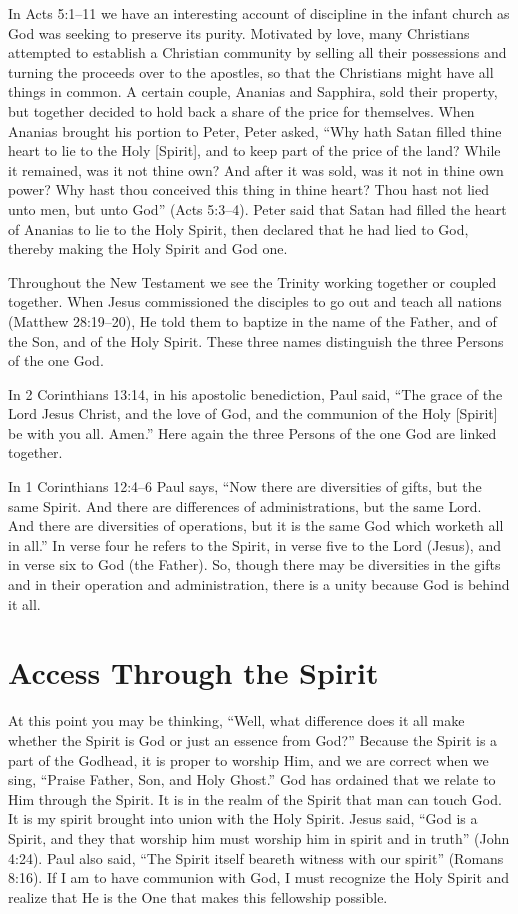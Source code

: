 In Acts 5:1–11 we have an interesting account of discipline
in the infant church as God was seeking to preserve
its purity. Motivated by love, many Christians attempted
to establish a Christian community by selling all their possessions
and turning the proceeds over to the apostles, so
that the Christians might have all things in common. A certain
couple, Ananias and Sapphira, sold their property, but
together decided to hold back a share of the price for themselves.
When Ananias brought his portion to Peter, Peter
asked, “Why hath Satan filled thine heart to lie to the Holy
[Spirit], and to keep part of the price of the land? While it
remained, was it not thine own? And after it was sold, was
it not in thine own power? Why hast thou conceived this
thing in thine heart? Thou hast not lied unto men, but unto
God” (Acts 5:3–4). Peter said that Satan had filled the heart
of Ananias to lie to the Holy Spirit, then declared that he
had lied to God, thereby making the Holy Spirit and God
one.

Throughout the New Testament we see the Trinity working
together or coupled together. When Jesus commissioned
the disciples to go out and teach all nations (Matthew
28:19–20), He told them to baptize in the name of the Father,
and of the Son, and of the Holy Spirit. These three names
distinguish the three Persons of the one God.

In 2 Corinthians 13:14, in his apostolic benediction, Paul
said, “The grace of the Lord Jesus Christ, and the love of
God, and the communion of the Holy [Spirit] be with you
all. Amen.” Here again the three Persons of the one God are
linked together.

In 1 Corinthians 12:4–6 Paul says, “Now there are diversities
of gifts, but the same Spirit. And there are differences
of administrations, but the same Lord. And there are diversities
of operations, but it is the same God which worketh
all in all.” In verse four he refers to the Spirit, in verse five
to the Lord (Jesus), and in verse six to God (the Father).
So, though there may be diversities in the gifts and in their
operation and administration, there is a unity because God
is behind it all.


\section*{Access Through the Spirit}

At this point you may be thinking, “Well, what difference
does it all make whether the Spirit is God or just an
essence from God?” Because the Spirit is a part of the Godhead,
it is proper to worship Him, and we are correct when
we sing, “Praise Father, Son, and Holy Ghost.” God has
ordained that we relate to Him through the Spirit. It is in the
realm of the Spirit that man can touch God. It is my spirit
brought into union with the Holy Spirit. Jesus said, “God
is a Spirit, and they that worship him must worship him in
spirit and in truth” (John 4:24). Paul also said, “The Spirit
itself beareth witness with our spirit” (Romans 8:16). If I am
to have communion with God, I must recognize the Holy
Spirit and realize that He is the One that makes this fellowship
possible.

